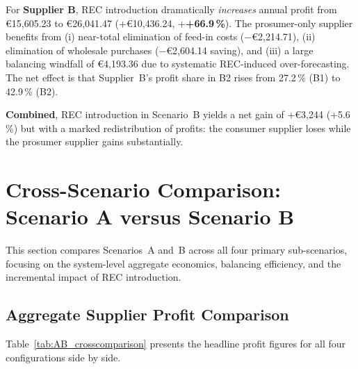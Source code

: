 For \textbf{Supplier B}, REC introduction dramatically \emph{increases} annual
profit from €15{,}605.23 to €26{,}041.47 (+€10{,}436.24, +\textbf{+66.9\,\%}).
The prosumer-only supplier benefits from (i) near-total elimination of
feed-in costs ($-$€2{,}214.71), (ii) elimination of wholesale purchases
($-$€2{,}604.14 saving), and (iii) a large balancing windfall of €4{,}193.36
due to systematic REC-induced over-forecasting.  The net effect is that
Supplier~B's profit share in B2 rises from 27.2\,\% (B1) to 42.9\,\% (B2).

\textbf{Combined}, REC introduction in Scenario~B yields a net gain of +€3{,}244
(+5.6\,\%) but with a marked redistribution of profits: the consumer supplier
loses while the prosumer supplier gains substantially.


\section{Cross-Scenario Comparison: Scenario A versus Scenario B}
\label{sec:results_AB_crosscomparison}

This section compares Scenarios~A and~B across all four primary sub-scenarios,
focusing on the system-level aggregate economics, balancing efficiency, and
the incremental impact of REC introduction.

\subsection{Aggregate Supplier Profit Comparison}

Table~\ref{tab:AB_crosscomparison} presents the headline profit figures for all
four configurations side by side.

